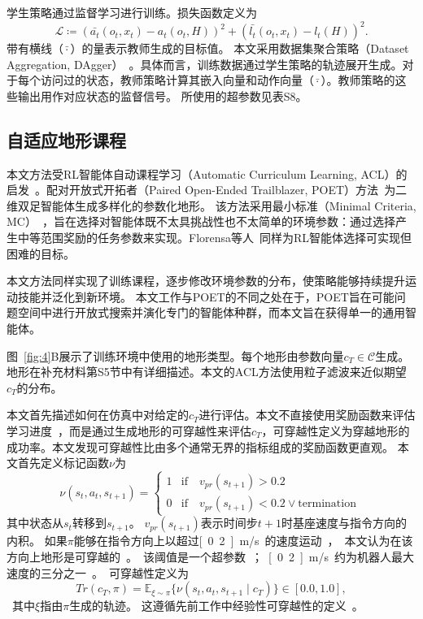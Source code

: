 \documentclass[9pt,twocolumn,twoside]{osajnl}
\begin{document}
学生策略通过监督学习进行训练。损失函数定义为
\begin{equation}
    \mathcal{L} \coloneqq (\bar{a_t}(o_t, x_t) - a_t(o_t, H))^2 +  (\bar{l_t}(o_t, x_t) - l_t(H))^2.
\label{eq:student}\end{equation}
带有横线（$\bar{\cdot}$）的量表示教师生成的目标值。
本文采用数据集聚合策略（Dataset Aggregation, DAgger）~\cite{ross2011reduction}。具体而言，训练数据通过学生策略的轨迹展开生成。对于每个访问过的状态，教师策略计算其嵌入向量和动作向量（$\bar{\cdot}$）。教师策略的这些输出用作对应状态的监督信号。
所使用的超参数见表S8。

\subsection*{自适应地形课程}

本文方法受RL智能体自动课程学习（Automatic Curriculum Learning, ACL）的启发~\cite{wang2019paired,florensa2018automatic}。配对开放式开拓者（Paired Open-Ended Trailblazer, POET）方法~\cite{wang2019paired}为二维双足智能体生成多样化的参数化地形。
该方法采用最小标准（Minimal Criteria, MC）~\cite{lehman2010revising,brant2017minimal}，旨在选择对智能体既不太具挑战性也不太简单的环境参数：通过选择产生中等范围奖励的任务参数来实现。Florensa等人~\cite{florensa2018automatic}同样为RL智能体选择可实现但困难的目标。

本文方法同样实现了训练课程，逐步修改环境参数的分布，使策略能够持续提升运动技能并泛化到新环境。
本文工作与POET的不同之处在于，POET旨在可能问题空间中进行开放式搜索并演化专门的智能体种群，而本文旨在获得单一的通用智能体。

图~\ref{fig:4}B展示了训练环境中使用的地形类型。每个地形由参数向量$c_T \in \mathcal{C}$生成。地形在补充材料第S5节中有详细描述。本文的ACL方法使用粒子滤波来近似期望$c_T$的分布。

本文首先描述如何在仿真中对给定的$c_T$进行评估。本文不直接使用奖励函数来评估学习进度~\cite{matiisen2019teacher,wang2019paired,yu2018learning,akkaya2019solving}，而是通过生成地形的可穿越性来评估$c_T$，可穿越性定义为穿越地形的成功率。本文发现可穿越性比由多个通常无界的指标组成的奖励函数更直观。
本文首先定义标记函数$\nu$为
\begin{equation}
  \nu(s_t, a_t, s_{t+1}) =
\begin{cases}
1  & \text{if}\quad v_{pr}(s_{t+1}) > 0.2\\
0  & \text{if}\quad v_{pr}(s_{t+1}) < 0.2 \lor \text{termination}
\end{cases}{}
~\label{traj_score}
\end{equation}
其中状态从$s_t$转移到$s_{t+1}$。
$v_{pr}(s_{t+1})$表示时间步$t+1$时基座速度与指令方向的内积。
如果$\pi$能够在指令方向上以超过\unit[0.2]{m/s}的速度运动，本文认为在该方向上地形是可穿越的。该阈值是一个超参数；\unit[0.2]{m/s}约为机器人最大速度的三分之一。可穿越性定义为
\begin{equation}
Tr(c_T,\pi) = \mathbb{E}_{\xi \sim  \pi} \{ \nu(s_t, a_t, s_{t+1} \mid c_{T}) \} \in [0.0, 1.0],
\label{def:traversability}\end{equation}
其中$\xi$指由$\pi$生成的轨迹。
这遵循先前工作中经验性可穿越性的定义~\cite{chavez2018learning}。
\end{document}

